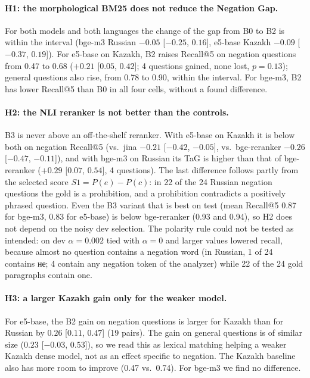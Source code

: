 \documentclass[11pt]{article}
\newcommand{\ru}[1]{#1}
\begin{document}
\paragraph{H1: the morphological BM25 does not reduce the Negation Gap.} For both models and both languages
the change of the gap from B0 to B2 is within the interval (bge-m3 Russian $-0.05$ [$-0.25$, $0.16$], e5-base
Kazakh $-0.09$ [$-0.37$, $0.19$]). For e5-base on Kazakh, B2 raises Recall@5 on negation questions from 0.47 to
0.68 ($+0.21$ [$0.05$, $0.42$]; 4 questions gained, none lost, $p = 0.13$); general questions also rise, from 0.78 to 0.90, within the interval. For
bge-m3, B2 has lower Recall@5 than B0 in all four cells, without a found difference.

\paragraph{H2: the NLI reranker is not better than the controls.} B3 is never above an off-the-shelf
reranker. With e5-base on Kazakh it is below both on negation Recall@5 (vs.\ jina $-0.21$ [$-0.42$,
$-0.05$], vs.\ bge-reranker $-0.26$ [$-0.47$, $-0.11$]), and with bge-m3 on Russian its TaG is higher than
that of bge-reranker ($+0.29$ [$0.07$, $0.54$], 4 questions). The last difference follows partly from the
selected score $S1 = P(e) - P(c)$: in 22 of the 24 Russian negation questions the gold is a prohibition, and
a prohibition contradicts a positively phrased question. Even the B3 variant that is best on test (mean
Recall@5 0.87 for bge-m3, 0.83 for e5-base) is below bge-reranker (0.93 and 0.94), so H2 does not depend on
the noisy dev selection. The polarity rule could not be tested as intended: on dev $\alpha = 0.002$ tied
with $\alpha = 0$ and larger values lowered recall, because almost no question contains a negation word (in
Russian, 1 of 24 contains \ru{не}; 4 contain any negation token of the analyzer) while 22 of the 24 gold
paragraphs contain one.

\paragraph{H3: a larger Kazakh gain only for the weaker model.} For e5-base, the B2 gain on negation questions
is larger for Kazakh than for Russian by $0.26$ [$0.11$, $0.47$] (19 pairs). The gain on general questions is
of similar size ($0.23$ [$-0.03$, $0.53$]), so we read this as lexical matching helping a weaker Kazakh dense
model, not as an effect specific to negation. The Kazakh baseline also has more room to improve (0.47 vs.\
0.74). For bge-m3 we find no difference.
\end{document}
